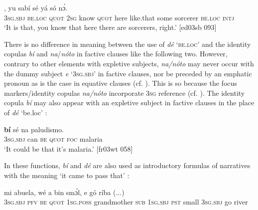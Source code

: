 \ea%
    \label{ex:key:1133}
    \gll {}        ,    yu  sabí    sé    yá    só
            nɔ́.\\
\textsc{3sg.sbj}  \textsc{be.loc}  \textsc{quot}    \textsc{2sg}  know  \textsc{quot}    here    like.that
some  sorcerer    \textsc{be.loc}  \textsc{intj}\\

\glt ‘It is that, you know that here there are sorcerers, right.’ [ed03sb 093]
\z

There is no difference in meaning between the use of \textit{dé} \textsc{‘be.loc’} and the identity copulas \textit{bí} and \textit{na}/\textit{nóto} in factive clauses like the following two. However, contrary to other elements with expletive subjects, \textit{na}\textit{\textup{/}}\textit{nóto} may never occur with the dummy subject \textit{e} ‘\textsc{3sg.sbj}’ in factive clauses, nor be preceded by an emphatic pronoun as is the case in equative clauses (cf. ). This is so because the focus markers/identity copulas \textit{na}\textit{\textup{/}}\textit{nóto} incorporate \textsc{3sg} reference (cf. ). The identity copula \textit{bí} may also appear with an expletive subject in factive clauses in the place of \textit{dé} ‘be.loc’ :


\ea%
    \label{ex:key:1134}
    \gll {}      \textbf{bí}  sé    na  paludismo.\\
\textsc{3sg.sbj}  can  \textsc{be}  \textsc{quot}    \textsc{foc}  malaria\\

\glt ‘It could be that it’s malaria.’ [fr03wt 058]
\z

In these functions, \textit{bí} and \textit{dé} are also used as introductory formulas of narratives with the meaning ‘it came to pass that’ :


\ea%
    \label{ex:key:1135}
    \gll {}            mi    abuela,    wé  a
bin  smɔ́l,  e    gó  ríba    (...)\\
\textsc{3sg.sbj}  \textsc{pfv}  \textsc{be}  \textsc{quot}    \textsc{1sg.poss}  grandmother  \textsc{sub}  \textsc{1sg.sbj}
\textsc{pst}  small  \textsc{3sg.sbj}  go  river\\


